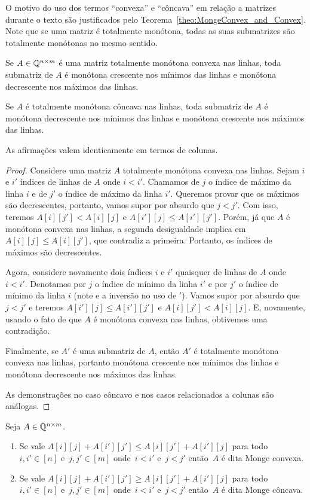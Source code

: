 O motivo do uso dos termos ``convexa'' e ``côncava'' em relação a matrizes durante o texto são justificados pelo Teorema~\ref{theo:MongeConvex_and_Convex}. Note que se uma matriz é totalmente monótona, todas as suas submatrizes são totalmente monótonas no mesmo sentido.

\begin{lema} \label{lema:MonotoneTotallyMonotone}
Se $A \in \mathbb{Q}^{n \times m}$ é uma matriz totalmente monótona convexa nas linhas, toda submatriz de $A$ é monótona crescente nos mínimos das linhas e monótona decrescente nos máximos das linhas.  

Se $A$ é totalmente monótona côncava nas linhas, toda submatriz de $A$ é monótona decrescente nos mínimos das linhas e monótona crescente nos máximos das linhas.  

As afirmações valem identicamente em termos de colunas.
\end{lema}

\begin{proof}
Considere uma matriz $A$ totalmente monótona convexa nas linhas. Sejam $i$ e $i'$ índices de linhas de $A$ onde $i < i'$. Chamamos de $j$ o índice de máximo da linha $i$ e de $j'$ o índice de máximo da linha $i'$. Queremos provar que os máximos são decrescentes, portanto, vamos supor por absurdo que $j < j'$. Com isso, teremos $A[i][j'] < A[i][j]$ e $A[i'][j] \leq A[i'][j']$. Porém, já que $A$ é monótona convexa nas linhas, a segunda desigualdade implica em $A[i][j] \leq A[i][j']$, que contradiz a primeira. Portanto, os índices de máximos são decrescentes.  

Agora, considere novamente dois índices $i$ e $i'$ quaisquer de linhas de $A$ onde $i < i'$. Denotamos por $j$ o índice de mínimo da linha $i'$ e por $j'$ o índice de mínimo da linha $i$ (note e a inversão no uso de $'$). Vamos supor por absurdo que $j < j'$ e teremos $A[i'][j] \leq A[i'][j']$ e $A[i][j'] < A[i][j]$. E, novamente, usando o fato de que $A$ é monótona convexa nas linhas, obtivemos uma contradição.  

Finalmente, se $A'$ é uma submatriz de $A$, então $A'$ é totalmente monótona convexa nas linhas, portanto monótona crescente nos mínimos das linhas e monótona decrescente nos máximos das linhas.

As demonstrações no caso côncavo e nos casos relacionados a colunas são análogas.
\end{proof}

\begin{defi} \label{defi:MatrizMonge}
Seja $A \in \mathbb{Q}^{n \times m}$.
    \begin{enumerate}
        \item Se vale $A[i][j] + A[i'][j'] \leq A[i][j'] + A[i'][j]$ para todo~${i,i' \in [n]}$ e~${j,j' \in [m]}$ onde~${i<i'}$ e~${j<j'}$ então~$A$ é dita Monge convexa.
        \item Se vale $A[i][j] + A[i'][j'] \geq A[i][j'] + A[i'][j]$ para todo~${i,i' \in [n]}$ e~${j,j' \in [m]}$ onde~${i<i'}$ e~${j<j'}$ então~$A$ é dita Monge côncava.
    \end{enumerate}
\end{defi}

